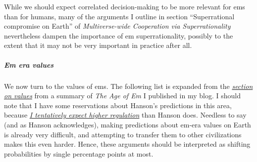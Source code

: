\documentclass[]{article}
\let\oldsubparagraph\subparagraph
\renewcommand{\subparagraph}[1]{\oldsubparagraph{#1}\mbox{}}
\begin{document}
While we should expect correlated decision-making to be more relevant
for ems than for humans, many of the arguments I outline in section
``Superrational compromise on Earth'' of \emph{Multiverse-wide Cooperation via
Superrationality} 
nevertheless dampen the importance of em
superrationality, possibly to the extent that it may not be very
important in practice after all.

\subparagraph{Em era values}\label{em-era-values}

We now turn to the values of ems. The following list is expanded from
the
\href{https://casparoesterheld.com/2016/08/30/the-age-of-em-summary-of-policy-relevant-information/\#Values}{\emph{section
on values}} from a summary of \emph{The Age of Em} I published in my blog.
I should note that I have some reservations about Hanson's predictions
in this area, because
\href{https://casparoesterheld.com/2016/08/30/the-age-of-em-summary-of-policy-relevant-information/\#regulation}{\emph{I
tentatively expect higher regulation}} than Hanson does. Needless to say
(and as Hanson acknowledges), making predictions about em-era values on
Earth is already very difficult, and attempting to transfer them to
other civilizations makes this even harder. Hence, these arguments
should be interpreted as shifting probabilities by single percentage
points at most.
\end{document}
